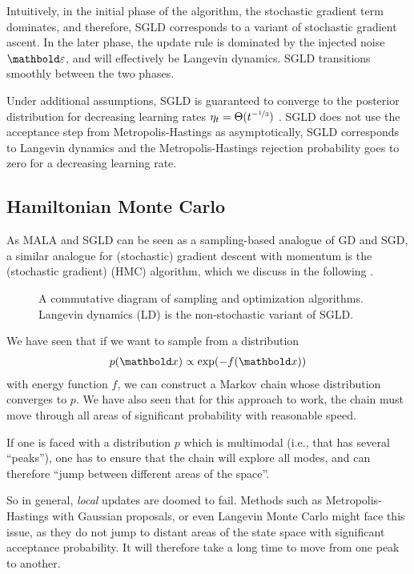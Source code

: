 Intuitively, in the initial phase of the algorithm, the stochastic gradient term dominates, and therefore, SGLD corresponds to a variant of stochastic gradient ascent. In the later phase, the update rule is dominated by the injected noise $\vvarepsilon$, and will effectively be Langevin dynamics. SGLD transitions smoothly between the two phases.

Under additional assumptions, SGLD is guaranteed to converge to the posterior distribution for decreasing learning rates ${\eta_t = \Theta(t^{-\nicefrac{1}{3}})}$ \citep{raginsky2017non,xu2018global}.
SGLD does not use the acceptance step from Metropolis-Hastings as asymptotically, SGLD corresponds to Langevin dynamics and the Metropolis-Hastings rejection probability goes to zero for a decreasing learning rate.


\subsection{Hamiltonian Monte Carlo}

As MALA and SGLD can be seen as a sampling-based analogue of GD and SGD, a similar analogue for (stochastic) gradient descent with momentum is the (stochastic gradient)  (HMC) algorithm, which we discuss in the following \citep{duane1987hybrid,sghmc}.

\begin{figure}
  \caption{A commutative diagram of sampling and optimization algorithms.
  Langevin dynamics (LD) is the non-stochastic variant of SGLD.}
\end{figure}

We have seen that if we want to sample from a distribution \begin{align*}
  p(\vx) \propto \exp(-f(\vx))
\end{align*} with energy function $f$, we can construct a Markov chain whose distribution converges to $p$.
We have also seen that for this approach to work, the chain must move through all areas of significant probability with reasonable speed.

If one is faced with a distribution $p$ which is multimodal (i.e., that has several ``peaks''), one has to ensure that the chain will explore all modes, and can therefore ``jump between different areas of the space''.

So in general, \emph{local} updates are doomed to fail.
Methods such as Metropolis-Hastings with Gaussian proposals, or even Langevin Monte Carlo might face this issue, as they do not jump to distant areas of the state space with significant acceptance probability.
It will therefore take a long time to move from one peak to another.

